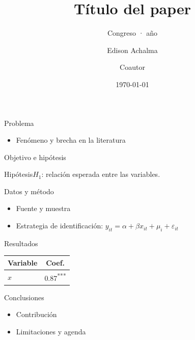 \documentclass{academic-beamer}
\title{Título del paper}
\subtitle{Congreso · año}
\author{Edison Achalma \and Coautor}
\institute{Universidad Nacional de San Cristóbal de Huamanga}
\date{\today}
\begin{document}
\begin{frame}\titlepage\end{frame}

\begin{frame}{Problema}
\begin{itemize}\item Fenómeno y brecha en la literatura\end{itemize}
\end{frame}

\begin{frame}{Objetivo e hipótesis}
\begin{block}{Hipótesis}$H_1$: relación esperada entre las variables.\end{block}
\end{frame}

\begin{frame}{Datos y método}
\begin{itemize}\item Fuente y muestra \item Estrategia de identificación: $y_{it}=\alpha+\beta x_{it}+\mu_i+\varepsilon_{it}$\end{itemize}
\end{frame}

\begin{frame}{Resultados}
\begin{table}\centering\begin{tabular}{lc}\toprule Variable & Coef. \\\midrule $x$ & 0.87\textsuperscript{***} \\\bottomrule\end{tabular}\end{table}
\end{frame}

\begin{frame}{Conclusiones}
\begin{itemize}\item Contribución \item Limitaciones y agenda\end{itemize}
\vfill{}
\end{frame}
\end{document}
